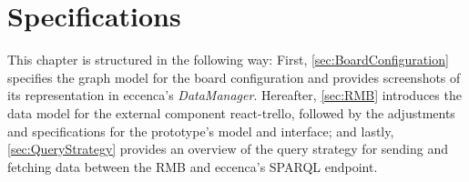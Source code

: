 \chapter{Specifications}\label{ch:Specifications}

This chapter is structured in the following way: First, \autoref{sec:BoardConfiguration} specifies the graph model for the board configuration and provides screenshots of its representation in eccenca’s \textit{DataManager}. Hereafter, \autoref{sec:RMB} introduces the data model for the external component react-trello, followed by the adjustments and specifications for the prototype’s model and interface; and lastly, \autoref{sec:QueryStrategy} provides an overview of the query strategy for sending and fetching data between the \acrshort*{RMB} and eccenca’s \acrshort*{SPARQL} endpoint.



